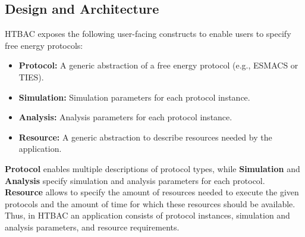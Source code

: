 



\subsection{Design and Architecture}\label{ssec:design_arch}

HTBAC exposes the following user-facing constructs to enable users to specify
free energy protocols: %

\begin{itemize}
  \item \textbf{Protocol:} A generic abstraction of a free energy protocol
  (e.g., ESMACS or TIES).
  \item \textbf{Simulation:} Simulation parameters for each protocol
  instance.
  \item \textbf{Analysis:} Analysis parameters for each protocol instance.
  \item \textbf{Resource:} A generic abstraction to describe resources needed
  by the application.
\end{itemize}

\textbf{Protocol} enables multiple descriptions of protocol types, while
\textbf{Simulation} and \textbf{Analysis} specify simulation and analysis
parameters for each protocol. \textbf{Resource} allows to specify the amount
of resources needed to execute the given protocols and the amount of time for
which these resources should be available. Thus, in HTBAC an application
consists of protocol instances, simulation and analysis parameters, and
resource requirements.

